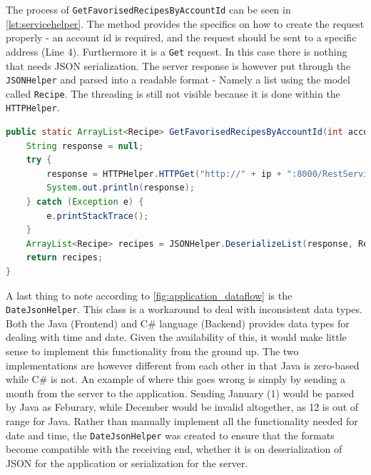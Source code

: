 The process of \texttt{GetFavorisedRecipesByAccountId} can be seen in \ref{lst:servicehelper}. The method provides the specifics on how to create the request properly - an account id is required, and the request should be sent to a specific address (Line 4). Furthermore it is a \texttt{Get} request.
In this case there is nothing that needs JSON serialization. The server response is however put through the \texttt{JSONHelper} and parsed into a readable format - Namely a list using the model called \texttt{Recipe}. The threading is still not visible because it is done within the \texttt{HTTPHelper}.

\begin{lstlisting}[language=java, label={lst:servicehelper}, caption={GetFavorisedRecipesByAccountId from ServiceHelper}]
public static ArrayList<Recipe> GetFavorisedRecipesByAccountId(int accountId){
    String response = null;
    try {
        response = HTTPHelper.HTTPGet("http://" + ip + ":8000/RestService/Favorises/GetFavorisedRecipesByAccountId?accountId=" + accountId);
        System.out.println(response);
    } catch (Exception e) {
        e.printStackTrace();
    }
    ArrayList<Recipe> recipes = JSONHelper.DeserializeList(response, Recipe.class);
    return recipes;
}
\end{lstlisting}

A last thing to note according to \ref{fig:application_dataflow} is the \texttt{DateJsonHelper}. This class is a workaround to deal with inconsistent data types. Both the Java (Frontend) and C\# language (Backend) provides data types for dealing with time and date. Given the availability of this, it would make little sense to implement this functionality from the ground up. The two implementations are however different from each other in that Java is zero-based while C\# is not. An example of where this goes wrong is simply by sending a month from the server to the application. Sending January (1) would be parsed by Java as Feburary, while December would be invalid altogether, as 12 is out of range for Java.
Rather than manually implement all the functionality needed for date and time, the \texttt{DateJsonHelper} was created to ensure that the formats become compatible with the receiving end, whether it is on deserialization of JSON for the application or serialization for the server.